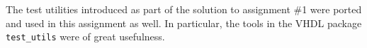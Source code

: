 The test utilities introduced as part of the solution to assignment \#1\cite{assignment-1} were ported and used in this assignment as well.
In particular, the tools in the VHDL package \texttt{test\_utils} were of great usefulness.

